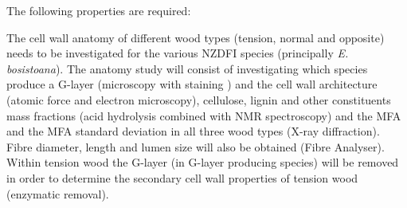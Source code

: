 The following properties are required:

The cell wall anatomy of different wood types (tension, normal and opposite)
needs to be investigated for the various NZDFI species (principally \textit{E.
bosistoana}). The anatomy study will consist of investigating which species
produce a G-layer (microscopy with staining \cite{Qiu_2008}) and the cell wall architecture
(atomic force and electron microscopy), cellulose, lignin and other constituents
mass fractions (acid hydrolysis combined with NMR spectroscopy) and the MFA and
the MFA standard deviation in all three wood types (X-ray diffraction). Fibre
diameter, length and lumen size will also be obtained (Fibre Analyser). Within
tension wood the G-layer (in G-layer producing species) will be
removed in order to determine the secondary cell wall properties of tension wood
(enzymatic removal).